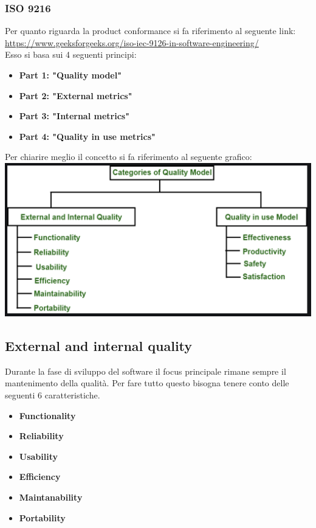 \documentclass{article}
\begin{document}
\subsubsection{ISO 9216}
Per quanto riguarda la product conformance si fa riferimento al seguente link: \url{https://www.geeksforgeeks.org/iso-iec-9126-in-software-engineering/}
\\Esso si basa sui 4 seguenti principi:
\begin{itemize}
    \item \textbf{Part 1: "Quality model"} 
    \item \textbf{Part 2: "External metrics"} 
    \item \textbf{Part 3: "Internal metrics"} 
    \item \textbf{Part 4: "Quality in use metrics"} 
\end{itemize}
Per chiarire meglio il concetto si fa riferimento al seguente grafico:
\\\includegraphics[scale = 0.25]{"Immagini/ISO9126.PNG"}
\subsection{External and internal quality}
Durante la fase di sviluppo del software il focus principale rimane sempre il mantenimento della qualità.
Per fare tutto questo bisogna tenere conto delle seguenti 6 caratteristiche.
\begin{itemize}
    \item \textbf{Functionality} 
    \item \textbf{Reliability} 
    \item \textbf{Usability} 
    \item \textbf{Efficiency} 
    \item \textbf{Maintanability} 
    \item \textbf{Portability} 
\end{itemize}
\end{document}
